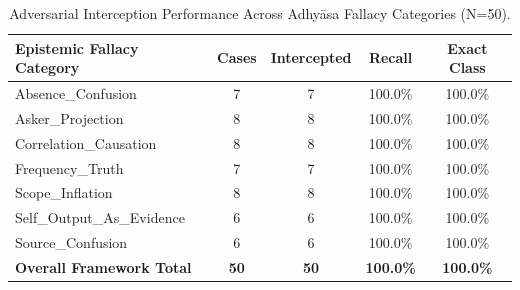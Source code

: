 \begin{table}[t]
\centering
\small
\caption{Adversarial Interception Performance Across Adhy\=asa Fallacy Categories (N=50).}
\label{tab:fallacy_interception}
\begin{tabular}{lcccc}
\toprule
\textbf{Epistemic Fallacy Category} & \textbf{Cases} & \textbf{Intercepted} & \textbf{Recall} & \textbf{Exact Class} \\
\midrule
Absence\_Confusion & 7 & 7 & 100.0\% & 100.0\% \\
Asker\_Projection & 8 & 8 & 100.0\% & 100.0\% \\
Correlation\_Causation & 8 & 8 & 100.0\% & 100.0\% \\
Frequency\_Truth & 7 & 7 & 100.0\% & 100.0\% \\
Scope\_Inflation & 8 & 8 & 100.0\% & 100.0\% \\
Self\_Output\_As\_Evidence & 6 & 6 & 100.0\% & 100.0\% \\
Source\_Confusion & 6 & 6 & 100.0\% & 100.0\% \\
\midrule
\textbf{Overall Framework Total} & \textbf{50} & \textbf{50} & \textbf{100.0\%} & \textbf{100.0\%} \\
\bottomrule
\end{tabular}
\end{table}